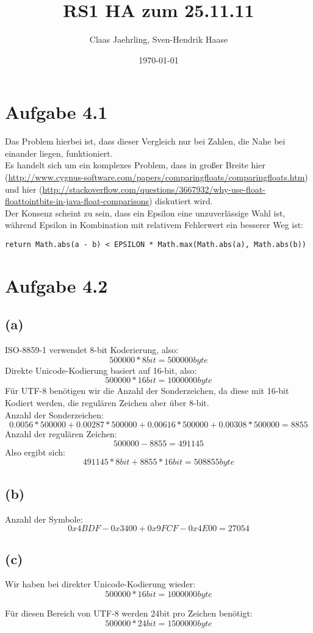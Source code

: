 \documentclass[12pt]{article}
\author{Claas Jaehrling, Sven-Hendrik Haase}
\title{RS1 HA zum 25.11.11}
\date{\today}
\begin{document}
\setcounter{secnumdepth}{0}
\maketitle

\section{Aufgabe 4.1}
Das Problem hierbei ist, dass dieser Vergleich nur bei Zahlen, die Nahe bei
einander liegen, funktioniert.
\\
Es handelt sich um ein komplexes Problem, dass in großer Breite hier
(\url{http://www.cygnus-software.com/papers/comparingfloats/comparingfloats.htm}) und hier (\url{http://stackoverflow.com/questions/3667932/why-use-float-floattointbits-in-java-float-comparisons}) diskutiert wird.
\\
Der Konsenz scheint zu sein, dass ein Epsilon eine unzuverlässige Wahl ist, während Epsilon in Kombination mit relativem Fehlerwert ein besserer Weg ist:
\begin{verbatim}
return Math.abs(a - b) < EPSILON * Math.max(Math.abs(a), Math.abs(b))
\end{verbatim}

\section{Aufgabe 4.2}
\subsection{(a)}
ISO-8859-1 verwendet 8-bit Koderierung, also: \[500000 * 8bit = 500000byte\]
Direkte Unicode-Kodierung basiert auf 16-bit, also: \[500000 * 16bit = 1000000byte\]
Für UTF-8 benötigen wir die Anzahl der Sonderzeichen, da diese mit 16-bit Kodiert werden, die regulären Zeichen aber über 8-bit.
\\
Anzahl der Sonderzeichen:
\[0.0056 * 500000 + 0.00287 * 500000 + 0.00616 * 500000 + 0.00308 * 500000 = 8855 \]
Anzahl der regulären Zeichen:
\[500000 - 8855 = 491145\]
Also ergibt sich:
\[491145 * 8bit + 8855 * 16bit = 508855byte\]

\subsection{(b)}
Anzahl der Symbole:
\[0x4BDF-0x3400+0x9FCF-0x4E00 = 27054\]

\subsection{(c)}
Wir haben bei direkter Unicode-Kodierung wieder:
\[500000 * 16bit = 1000000byte\]

Für diesen Bereich von UTF-8 werden 24bit pro Zeichen benötigt:
\[500000 * 24bit = 1500000byte\]
\end{document}
